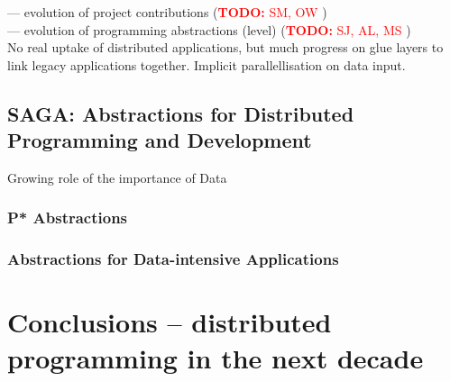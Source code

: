 \documentclass{article}
\newcommand{\B}[1]{\textbf{#1}}
\newcommand{\todo}[1]{{\textcolor{red}{\B{TODO:} #1 }}}
\begin{document}
 --- evolution of project contributions (\todo{SM, OW})\\
 
 --- evolution of programming abstractions (level) (\todo{SJ, AL, MS})\\
 
No real uptake of distributed applications, but much progress on glue layers to link legacy applications together.
Implicit parallellisation on data input.


\subsection{SAGA: Abstractions for Distributed Programming and
  Development}

Growing role of the importance of Data


\subsubsection{P* Abstractions}

\subsubsection{Abstractions for Data-intensive Applications}


\section{Conclusions -- distributed programming in the next decade}
\label{sec:sum}







\footnotesize


\end{document}
